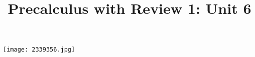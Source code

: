 \documentclass[handout]{xourse}
\title{Precalculus with Review 1: Unit 6}
\begin{document}
\texttt{[image: 2339356.jpg]}
\maketitle


	




\end{document}
